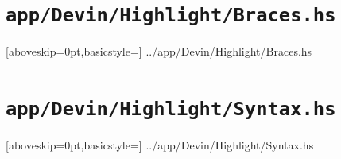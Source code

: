 \documentclass[UdineBachThesis,american,11pt,draft]{PhdThesis}
\begin{document}
  \section{\texttt{app/Devin/Highlight/Braces.hs}}

  
    [aboveskip=0pt,basicstyle=\ttfamily\footnotesize]
    {../app/Devin/Highlight/Braces.hs}

  \section{\texttt{app/Devin/Highlight/Syntax.hs}}

  
    [aboveskip=0pt,basicstyle=\ttfamily\footnotesize]
    {../app/Devin/Highlight/Syntax.hs}

  \printbibliography
\end{document}
